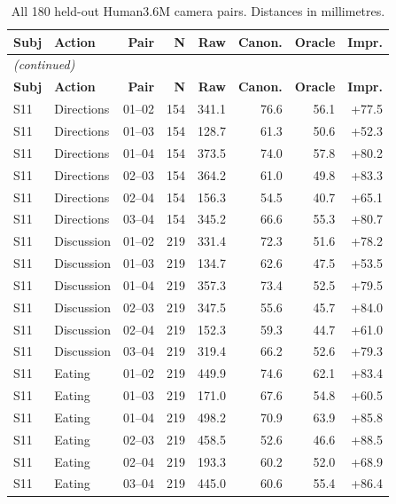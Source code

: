 \begin{center}
{\fontsize{10}{12}\selectfont
\begin{longtable}{llrrrrrr}
\caption{All 180 held-out Human3.6M camera pairs. Distances in millimetres.}\label{tab:apppairs}\\
\hline
\textbf{Subj} & \textbf{Action} & \textbf{Pair} & \textbf{N} & \textbf{Raw} & \textbf{Canon.} & \textbf{Oracle} & \textbf{Impr.} \\
\hline
\endfirsthead
\multicolumn{8}{l}{\textit{(continued)}}\\
\hline
\textbf{Subj} & \textbf{Action} & \textbf{Pair} & \textbf{N} & \textbf{Raw} & \textbf{Canon.} & \textbf{Oracle} & \textbf{Impr.} \\
\hline
\endhead
\hline
\endfoot
S11 & Directions & 01--02 & 154 & 341.1 & 76.6 & 56.1 & +77.5 \\
S11 & Directions & 01--03 & 154 & 128.7 & 61.3 & 50.6 & +52.3 \\
S11 & Directions & 01--04 & 154 & 373.5 & 74.0 & 57.8 & +80.2 \\
S11 & Directions & 02--03 & 154 & 364.2 & 61.0 & 49.8 & +83.3 \\
S11 & Directions & 02--04 & 154 & 156.3 & 54.5 & 40.7 & +65.1 \\
S11 & Directions & 03--04 & 154 & 345.2 & 66.6 & 55.3 & +80.7 \\
S11 & Discussion & 01--02 & 219 & 331.4 & 72.3 & 51.6 & +78.2 \\
S11 & Discussion & 01--03 & 219 & 134.7 & 62.6 & 47.5 & +53.5 \\
S11 & Discussion & 01--04 & 219 & 357.3 & 73.4 & 52.5 & +79.5 \\
S11 & Discussion & 02--03 & 219 & 347.5 & 55.6 & 45.7 & +84.0 \\
S11 & Discussion & 02--04 & 219 & 152.3 & 59.3 & 44.7 & +61.0 \\
S11 & Discussion & 03--04 & 219 & 319.4 & 66.2 & 52.6 & +79.3 \\
S11 & Eating & 01--02 & 219 & 449.9 & 74.6 & 62.1 & +83.4 \\
S11 & Eating & 01--03 & 219 & 171.0 & 67.6 & 54.8 & +60.5 \\
S11 & Eating & 01--04 & 219 & 498.2 & 70.9 & 63.9 & +85.8 \\
S11 & Eating & 02--03 & 219 & 458.5 & 52.6 & 46.6 & +88.5 \\
S11 & Eating & 02--04 & 219 & 193.3 & 60.2 & 52.0 & +68.9 \\
S11 & Eating & 03--04 & 219 & 445.0 & 60.6 & 55.4 & +86.4 \\

\end{longtable}}
\end{center}
